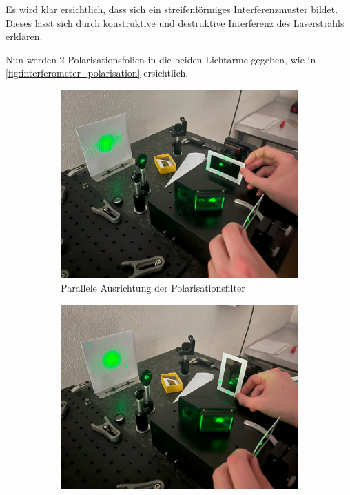 \documentclass[12pt,english,ngerman]{scrartcl}
\begin{document}
Es wird klar ersichtlich, dass sich ein streifenförmiges Interferenzmuster
bildet. Dieses lässt sich durch konstruktive und destruktive Interferenz des
Laserstrahls erklären.

Nun werden 2 Polarisationsfolien in die beiden Lichtarme gegeben, wie in
\autoref{fig:interferometer_polarisation} ersichtlich.

\begin{figure}[H]
	\centering
	\begin{subfigure}{.45\linewidth}
		\includegraphics[width=\textwidth]{./figures/Interferometer_polarisation_parallel.JPG}
		\caption{Parallele Ausrichtung der Polarisationsfilter
		}\label{fig:interferometer_polarisation_parallel}
	\end{subfigure}
	\begin{subfigure}{.45\linewidth}
		\includegraphics[width=\textwidth]{./figures/Interferometer_polarisation_normal.JPG}

\end{subfigure}
\end{figure}
\end{document}
